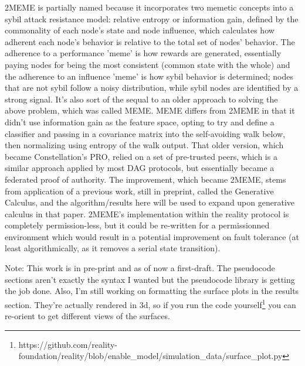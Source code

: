 \documentclass{article}
\begin{document}
2MEME is partially named because it incorporates two memetic concepts into a sybil attack resistance model: relative entropy or information gain, defined by the commonality of each node's state and node influence, which calculates how adherent each node's behavior is relative to the total set of nodes' behavior. The adherence to a performance 'meme' is how rewards are generated, essentially paying nodes for being the most consistent (common state with the whole) and the adherence to an influence 'meme' is how sybil behavior is determined; nodes that are not sybil follow a noisy distribution, while sybil nodes are identified by a strong signal. It's also sort of the sequal to an older approach to solving the above problem, which was called MEME. MEME differs from 2MEME in that it didn't use information gain as the feature space, opting to try and define a classifier and passing in a covariance matrix into the self-avoiding walk below, then normalizing using entropy of the walk output. That older version, which became Constellation's PRO, relied on a set of pre-trusted peers, which is a similar approach applied by most DAG protocols, but essentially became a federated proof of authority. The improvement, which became 2MEME, stems from application of a previous work, still in preprint, called the Generative Calculus, and the algorithm/results here will be used to expand upon generative calculus in that paper. 2MEME's implementation within the reality protocol is completely permission-less, but it could be re-written for a permissionned environment which would result in a potential improvement on fault tolerance (at least algorithmically, as it removes a serial state transition).

Note: This work is in pre-print and as of now a first-draft. The pseudocode sections aren't exactly the syntax I wanted but the pseudocode library is getting the job done. Also, I'm still working on formatting the surface plots in the results section. They're actually rendered in 3d, so if you run the code yourself\footnote{https://github.com/reality-foundation/reality/blob/enable\_model/simulation\_data/surface\_plot.py} you can re-orient to get different views of the surfaces.
\end{document}
